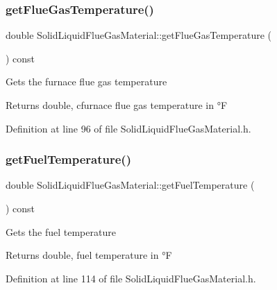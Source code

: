 \subsubsection{\texorpdfstring{get\+Flue\+Gas\+Temperature()}{getFlueGasTemperature()}}
{\footnotesize\ttfamily double Solid\+Liquid\+Flue\+Gas\+Material\+::get\+Flue\+Gas\+Temperature (\begin{DoxyParamCaption}{ }\end{DoxyParamCaption}) const\hspace{0.3cm}{\ttfamily [inline]}}

Gets the furnace flue gas temperature \begin{DoxyReturn}{Returns}
double, cfurnace flue gas temperature in °F 
\end{DoxyReturn}


Definition at line 96 of file Solid\+Liquid\+Flue\+Gas\+Material.\+h.

\mbox{\label{class_solid_liquid_flue_gas_material_a629ecc7104b6bfbb696d9478c4b48e7a}} 
\subsubsection{\texorpdfstring{get\+Fuel\+Temperature()}{getFuelTemperature()}}
{\footnotesize\ttfamily double Solid\+Liquid\+Flue\+Gas\+Material\+::get\+Fuel\+Temperature (\begin{DoxyParamCaption}{ }\end{DoxyParamCaption}) const\hspace{0.3cm}{\ttfamily [inline]}}

Gets the fuel temperature \begin{DoxyReturn}{Returns}
double, fuel temperature in °F 
\end{DoxyReturn}


Definition at line 114 of file Solid\+Liquid\+Flue\+Gas\+Material.\+h.

\mbox{\label{class_solid_liquid_flue_gas_material_af7d36673e49f9b5eb631fc04227883d6}} 
